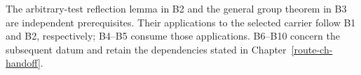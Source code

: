 \begin{remark}
  The arbitrary-test reflection lemma in B2 and the general group theorem
  in B3 are independent prerequisites.  Their applications to the selected
  carrier follow B1 and B2, respectively; B4--B5 consume those applications.
  B6--B10 concern the subsequent datum and retain the dependencies stated
  in Chapter~\ref{route-ch-handoff}.
\end{remark}
